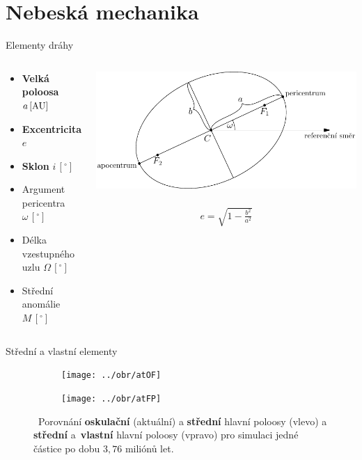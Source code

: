 \documentclass[xcolor=dvipsnames]{beamer}
\begin{document}
\section{Nebeská mechanika}


\begin{frame}[t]{\secname}{Elementy dráhy}
	\begin{columns}
		\begin{column}{0.5\textwidth}
		\begin{itemize}
			\item \textbf{Velká poloosa} $a\,[{\rm AU}]$  
			\item \textbf{Excentricita} $e$
			\item \textbf{Sklon} $i\,[ ^\circ]$
			\item Argument pericentra $\omega\,[ ^\circ]$
			\item Délka vzestupného uzlu $\Omega\,[ ^\circ]$
			\item Střední anomálie $M \,[ ^\circ]$
		\end{itemize}
		\end{column}
		\begin{column}{0.5\textwidth}
			\includegraphics[width=1.1\textwidth]{../asy/asteroidy-1.pdf}
			\
			\begin{align*}
				e=\sqrt{1-\frac{b^2}{a^2}}
			\end{align*}
		\end{column}
	\end{columns}
\end{frame}

\begin{frame}[t]{\secname}{Střední a vlastní elementy}
	\begin{figure}
		\centering
		\begin{subfigure}[b]{0.49\textwidth}
		\centering
		\texttt{[image: ../obr/atOF]}
		\end{subfigure}
		\begin{subfigure}[b]{0.49\textwidth}
		\centering
		\texttt{[image: ../obr/atFP]}
		\end{subfigure}
		\caption{\ Porovnání \textbf{oskulační} (aktuální) a \textbf{střední} hlavní poloosy (vlevo) a \textbf{střední} a~\textbf{vlastní} hlavní poloosy (vpravo) pro simulaci jedné částice po dobu $3,76$ miliónů let.}
	\end{figure}
\end{frame}
\end{document}
